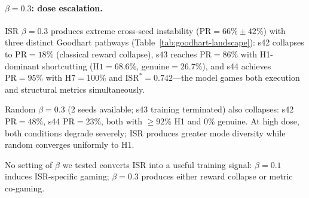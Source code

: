 \paragraph{$\beta{=}0.3$: dose escalation.}
ISR $\beta{=}0.3$ produces extreme cross-seed instability ($\mathrm{PR}{=}66\%{\pm}42\%$) with three distinct Goodhart pathways (Table~\ref{tab:goodhart-landscape}): s42 collapses to $\mathrm{PR}{=}18\%$ (classical reward collapse), s43 reaches $\mathrm{PR}{=}86\%$ with H1-dominant shortcutting ($\mathrm{H1}{=}68.6\%$, genuine${=}26.7\%$), and s44 achieves $\mathrm{PR}{=}95\%$ with $\mathrm{H7}{=}100\%$ and $\mathrm{ISR}^*{=}0.742$---the model games both execution and structural metrics simultaneously.

Random $\beta{=}0.3$ (2 seeds available; s43 training terminated) also collapses: s42 $\mathrm{PR}{=}48\%$, s44 $\mathrm{PR}{=}23\%$, both with ${\geq}92\%$ H1 and $0\%$ genuine.
At high dose, both conditions degrade severely; ISR produces greater mode diversity while random converges uniformly to H1.

No setting of $\beta$ we tested converts ISR into a useful training signal: $\beta{=}0.1$ induces ISR-specific gaming; $\beta{=}0.3$ produces either reward collapse or metric co-gaming.

